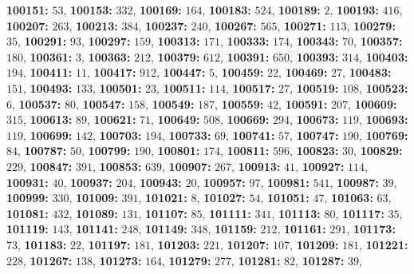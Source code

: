 \textsf{\bfseries 100151:} $53$, \textsf{\bfseries 100153:} $332$, \textsf{\bfseries 100169:} $164$, \textsf{\bfseries 100183:} $524$, \textsf{\bfseries 100189:} $2$, \textsf{\bfseries 100193:} $416$, \textsf{\bfseries 100207:} $263$, \textsf{\bfseries 100213:} $384$, \textsf{\bfseries 100237:} $240$, \textsf{\bfseries 100267:} $565$, \textsf{\bfseries 100271:} $113$, \textsf{\bfseries 100279:} $35$, \textsf{\bfseries 100291:} $93$, \textsf{\bfseries 100297:} $159$, \textsf{\bfseries 100313:} $171$, \textsf{\bfseries 100333:} $174$, \textsf{\bfseries 100343:} $70$, \textsf{\bfseries 100357:} $180$, \textsf{\bfseries 100361:} $3$, \textsf{\bfseries 100363:} $212$, \textsf{\bfseries 100379:} $612$, \textsf{\bfseries 100391:} $650$, \textsf{\bfseries 100393:} $314$, \textsf{\bfseries 100403:} $194$, \textsf{\bfseries 100411:} $11$, \textsf{\bfseries 100417:} $912$, \textsf{\bfseries 100447:} $5$, \textsf{\bfseries 100459:} $22$, \textsf{\bfseries 100469:} $27$, \textsf{\bfseries 100483:} $151$, \textsf{\bfseries 100493:} $133$, \textsf{\bfseries 100501:} $23$, \textsf{\bfseries 100511:} $114$, \textsf{\bfseries 100517:} $27$, \textsf{\bfseries 100519:} $108$, \textsf{\bfseries 100523:} $6$, \textsf{\bfseries 100537:} $80$, \textsf{\bfseries 100547:} $158$, \textsf{\bfseries 100549:} $187$, \textsf{\bfseries 100559:} $42$, \textsf{\bfseries 100591:} $207$, \textsf{\bfseries 100609:} $315$, \textsf{\bfseries 100613:} $89$, \textsf{\bfseries 100621:} $71$, \textsf{\bfseries 100649:} $508$, \textsf{\bfseries 100669:} $294$, \textsf{\bfseries 100673:} $119$, \textsf{\bfseries 100693:} $119$, \textsf{\bfseries 100699:} $142$, \textsf{\bfseries 100703:} $194$, \textsf{\bfseries 100733:} $69$, \textsf{\bfseries 100741:} $57$, \textsf{\bfseries 100747:} $190$, \textsf{\bfseries 100769:} $84$, \textsf{\bfseries 100787:} $50$, \textsf{\bfseries 100799:} $190$, \textsf{\bfseries 100801:} $174$, \textsf{\bfseries 100811:} $596$, \textsf{\bfseries 100823:} $30$, \textsf{\bfseries 100829:} $229$, \textsf{\bfseries 100847:} $391$, \textsf{\bfseries 100853:} $639$, \textsf{\bfseries 100907:} $267$, \textsf{\bfseries 100913:} $41$, \textsf{\bfseries 100927:} $114$, \textsf{\bfseries 100931:} $40$, \textsf{\bfseries 100937:} $204$, \textsf{\bfseries 100943:} $20$, \textsf{\bfseries 100957:} $97$, \textsf{\bfseries 100981:} $541$, \textsf{\bfseries 100987:} $39$, \textsf{\bfseries 100999:} $330$, \textsf{\bfseries 101009:} $391$, \textsf{\bfseries 101021:} $8$, \textsf{\bfseries 101027:} $54$, \textsf{\bfseries 101051:} $47$, \textsf{\bfseries 101063:} $63$, \textsf{\bfseries 101081:} $432$, \textsf{\bfseries 101089:} $131$, \textsf{\bfseries 101107:} $85$, \textsf{\bfseries 101111:} $341$, \textsf{\bfseries 101113:} $80$, \textsf{\bfseries 101117:} $35$, \textsf{\bfseries 101119:} $143$, \textsf{\bfseries 101141:} $248$, \textsf{\bfseries 101149:} $348$, \textsf{\bfseries 101159:} $212$, \textsf{\bfseries 101161:} $291$, \textsf{\bfseries 101173:} $73$, \textsf{\bfseries 101183:} $22$, \textsf{\bfseries 101197:} $181$, \textsf{\bfseries 101203:} $221$, \textsf{\bfseries 101207:} $107$, \textsf{\bfseries 101209:} $181$, \textsf{\bfseries 101221:} $228$, \textsf{\bfseries 101267:} $138$, \textsf{\bfseries 101273:} $164$, \textsf{\bfseries 101279:} $277$, \textsf{\bfseries 101281:} $82$, \textsf{\bfseries 101287:} $39$, 

